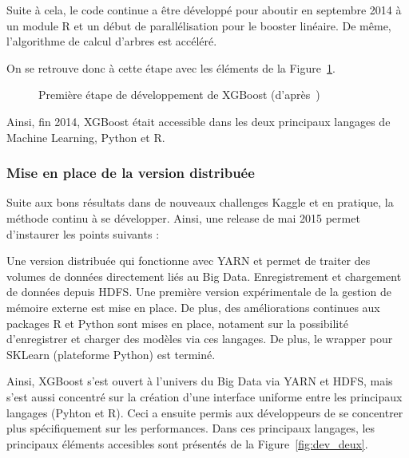 Suite à cela, le code continue a être développé pour aboutir en septembre 2014 à un module R et un début de parallélisation pour le booster linéaire. De même, l'algorithme de calcul d'arbres est accéléré.

On se retrouve donc à cette étape avec les éléments de la Figure~\ref{fig:dev_un}.

\begin{figure}[h]
	\begin{margincap}
		\centering
	  	\resizebox{.98\textwidth}{!}{%
		}
		\caption{Première étape de développement de XGBoost (d'après~\cite{bib:xgboost-author})}
		\label{fig:dev_un}
	\end{margincap}
\end{figure}

Ainsi, fin 2014, XGBoost était accessible dans les deux principaux langages de Machine Learning, Python et R.

\subsubsection{Mise en place de la version distribuée}
Suite aux bons résultats dans de nouveaux challenges Kaggle et en pratique, la méthode continu à se développer. Ainsi, une release de mai 2015 permet d'instaurer les points suivants :\begin{itemize}
	Une version distribuée qui fonctionne avec YARN et permet de traiter des volumes de données directement liés au Big Data.
	Enregistrement et chargement de données depuis HDFS.
	Une première version expérimentale de la gestion de mémoire externe est mise en place.
	De plus, des améliorations continues aux packages R et Python sont mises en place, notament sur la possibilité d'enregistrer et charger des modèles via ces langages. De plus, le wrapper pour SKLearn (plateforme Python) est terminé.
\end{itemize}
Ainsi, XGBoost s'est ouvert à l'univers du Big Data via YARN et HDFS, mais s'est aussi concentré sur la création d'une interface uniforme entre les principaux langages (Pyhton et R). Ceci a ensuite permis aux développeurs de se concentrer plus spécifiquement sur les performances. Dans ces principaux langages, les principaux éléments accesibles sont présentés de la Figure~\ref{fig:dev_deux}.

